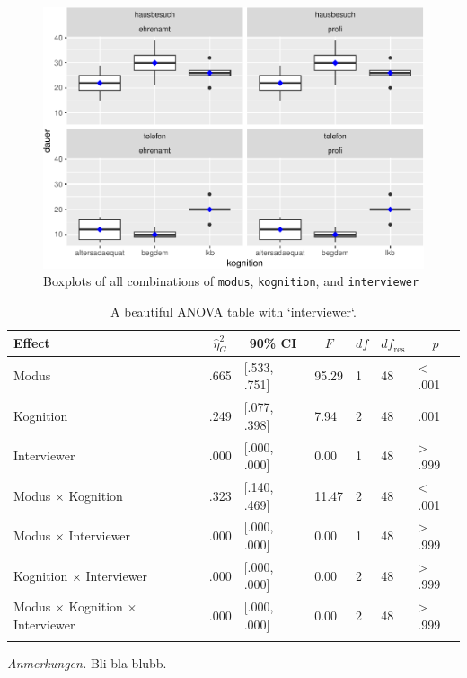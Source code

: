 \documentclass[
  doc,floatsintext]{apa6}
\begin{document}
\begin{figure}
\centering
\includegraphics{desc_reg_files/figure-latex/df3boxplot-1.pdf}
\caption{\label{fig:df3boxplot}Boxplots of all combinations of \texttt{modus}, \texttt{kognition}, and \texttt{interviewer}}
\end{figure}

\begin{table}[tbp]

\begin{center}
\begin{threeparttable}

\caption{\label{tab:tabanova3}A beautiful ANOVA table with `interviewer`.}

\begin{tabular}{lllllll}
\toprule
Effect & \multicolumn{1}{c}{$\hat{\eta}^2_G$} & \multicolumn{1}{c}{90\% CI} & \multicolumn{1}{c}{$F$} & \multicolumn{1}{c}{$\mathit{df}$} & \multicolumn{1}{c}{$\mathit{df}_{\mathrm{res}}$} & \multicolumn{1}{c}{$p$}\\
\midrule
Modus & .665 & {}[.533, .751] & 95.29 & 1 & 48 & < .001\\
Kognition & .249 & {}[.077, .398] & 7.94 & 2 & 48 & .001\\
Interviewer & .000 & {}[.000, .000] & 0.00 & 1 & 48 & > .999\\
Modus $\times$ Kognition & .323 & {}[.140, .469] & 11.47 & 2 & 48 & < .001\\
Modus $\times$ Interviewer & .000 & {}[.000, .000] & 0.00 & 1 & 48 & > .999\\
Kognition $\times$ Interviewer & .000 & {}[.000, .000] & 0.00 & 2 & 48 & > .999\\
Modus $\times$ Kognition $\times$ Interviewer & .000 & {}[.000, .000] & 0.00 & 2 & 48 & > .999\\
\bottomrule
\addlinespace
\end{tabular}

\begin{tablenotes}[para]
\normalsize{\textit{Anmerkungen.} Bli bla blubb.}
\end{tablenotes}

\end{threeparttable}
\end{center}

\end{table}
\end{document}
